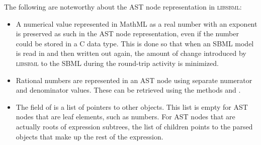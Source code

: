 \documentclass{sbmlmanual}
\newcommand{\libsbml}{\textsc{libsbml}}
\begin{document}
The following are noteworthy about the AST node representation in \libsbml{}:

\begin{itemize}
  
\item A numerical value represented in MathML as a real number with an
  exponent is preserved as such in the AST node representation, even if the
  number could be stored in a C  data type.  This is done so
  that when an SBML model is read in and then written out again, the amount
  of change introduced by \libsbml{} to the SBML during the round-trip
  activity is minimized.
  
\item Rational numbers are represented in an AST node using separate
  numerator and denominator values.  These can be retrieved using the
   methods  and
  .
   
  
\item The  field of  is a list of
  pointers to other  objects.  This list is empty for AST
  nodes that are leaf elements, such as numbers.  For AST nodes that are
  actually roots of expression subtrees, the list of children points to the
  parsed objects that make up the rest of the expression.

\end{itemize}







\clearpage



\end{document}
